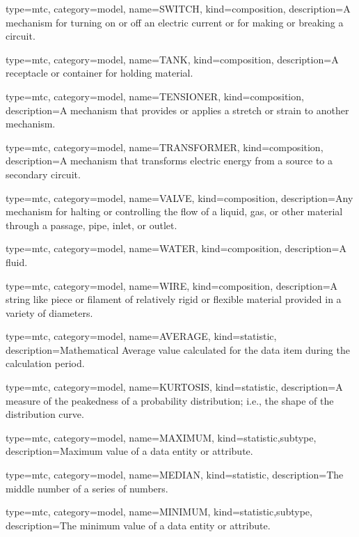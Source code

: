 {
  type=mtc,
  category=model,
  name={SWITCH},
  kind={composition},
  description={A mechanism for turning on or off an electric current or for making or breaking a circuit.}
}


{
  type=mtc,
  category=model,
  name={TANK},
  kind={composition},
  description={A receptacle or container for holding material.}
}


{
  type=mtc,
  category=model,
  name={TENSIONER},
  kind={composition},
  description={A mechanism that provides or applies a stretch or strain to another mechanism.}
}


{
  type=mtc,
  category=model,
  name={TRANSFORMER},
  kind={composition},
  description={A mechanism that transforms electric energy from a source to a secondary circuit.}
}


{
  type=mtc,
  category=model,
  name={VALVE},
  kind={composition},
  description={Any mechanism for halting or controlling the flow of a liquid, gas, or other material through a passage, pipe, inlet, or outlet.}
}


{
  type=mtc,
  category=model,
  name={WATER},
  kind={composition},
  description={A fluid.}
}


{
  type=mtc,
  category=model,
  name={WIRE},
  kind={composition},
  description={A string like piece or filament of relatively rigid or flexible material provided in a variety of diameters.}
}


{
  type=mtc,
  category=model,
  name={AVERAGE},
  kind={statistic},
  description={Mathematical Average value calculated for the data item during the calculation period.}
}


{
  type=mtc,
  category=model,
  name={KURTOSIS},
  kind={statistic},
  description={A measure of the peakedness of a probability distribution; i.e., the shape of the distribution curve.}
}


{
  type=mtc,
  category=model,
  name={MAXIMUM},
  kind={statistic,subtype},
  description={Maximum value of a data entity or attribute.}
}


{
  type=mtc,
  category=model,
  name={MEDIAN},
  kind={statistic},
  description={The middle number of a series of numbers.}
}


{
  type=mtc,
  category=model,
  name={MINIMUM},
  kind={statistic,subtype},
  description={The minimum value of a data entity or attribute.}
}


